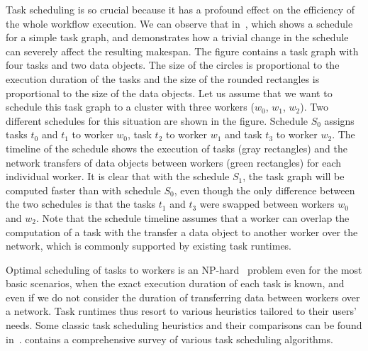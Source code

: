 Task scheduling is so crucial because it has a profound effect on the efficiency of the whole
workflow execution. We can observe that in~, which shows a schedule for a
simple task graph, and demonstrates how a trivial change in the schedule can severely affect the
resulting makespan. The figure contains a task graph with four tasks and two data objects. The size
of the circles is proportional to the execution duration of the tasks and the size of the rounded
rectangles is proportional to the size of the data objects. Let us assume that we want to schedule
this task graph to a cluster with three workers ($w_0$, $w_1$,
$w_2$). Two different schedules for this situation are shown in the figure.
Schedule $S_0$ assigns tasks $t_0$ and $t_1$ to
worker $w_0$, task $t_2$ to worker $w_1$ and
task $t_3$ to worker $w_2$. The timeline of the schedule shows
the execution of tasks (gray rectangles) and the network transfers of data objects between workers
(green rectangles) for each individual worker. It is clear that with the schedule
$S_1$, the task graph will be computed faster than with schedule
$S_0$, even though the only difference between the two schedules is that the tasks
$t_1$ and $t_3$ were swapped between workers
$w_0$ and $w_2$. Note that the schedule timeline assumes that a
worker can overlap the computation of a task with the transfer a data object to another worker over
the network, which is commonly supported by existing task runtimes.

Optimal scheduling of tasks to workers is an NP-hard~\cite{Ullman1975} problem even for the
most basic scenarios, when the exact execution duration of each task is known, and even if we do
not consider the duration of transferring data between workers over a network. Task runtimes thus
resort to various heuristics tailored to their users' needs. Some classic task scheduling
heuristics and their comparisons can be found in~\cite{hlfet1974,kwok1998benchmarking,hagras2003static,wang2018list,estee}. 
contains a comprehensive survey of various task scheduling algorithms.

